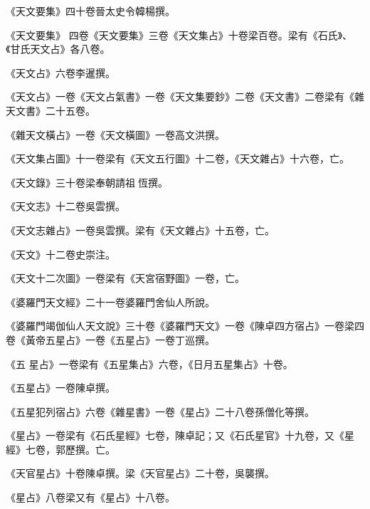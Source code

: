 \begin{pinyinscope}
 《天文要集》四十卷晉太史令韓楊撰。



 《天文要集》
 四卷《天文要集》三卷《天文集占》十卷梁百卷。梁有《石氏》、《甘氏天文占》各八卷。



 《天文占》六卷李暹撰。



 《天文占》一卷《天文占氣書》一卷《天文集要鈔》二卷《天文書》二卷梁有《雜天文書》二十五卷。



 《雜天文橫占》一卷《天文橫圖》一卷高文洪撰。



 《天文集占圖》十一卷梁有《天文五行圖》十二卷，《天文雜占》十六卷，亡。



 《天文錄》三十卷梁奉朝請祖恆撰。



 《天文志》十二卷吳雲撰。



 《天文志雜占》一卷吳雲撰。梁有《天文雜占》十五卷，亡。



 《天文》十二卷史崇注。



 《天文十二次圖》一卷梁有《天宮宿野圖》一卷，亡。



 《婆羅門天文經》二十一卷婆羅門舍仙人所說。



 《婆羅門竭伽仙人天文說》三十卷《婆羅門天文》一卷《陳卓四方宿占》一卷梁四卷《黃帝五星占》一卷《五星占》一卷丁巡撰。



 《五
 星占》一卷梁有《五星集占》六卷，《日月五星集占》十卷。



 《五星占》一卷陳卓撰。



 《五星犯列宿占》六卷《雜星書》一卷《星占》二十八卷孫僧化等撰。



 《星占》一卷梁有《石氏星經》七卷，陳卓記；又《石氏星官》十九卷，又《星經》七卷，郭歷撰。亡。



 《天官星占》十卷陳卓撰。梁《天官星占》二十卷，吳襲撰。



 《星占》八卷梁又有《星占》十八卷。




\end{pinyinscope}

